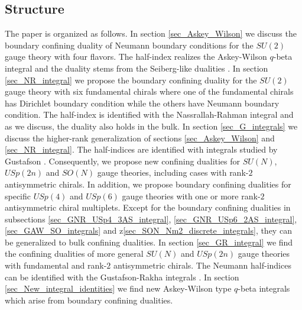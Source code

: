 \documentclass[12pt]{article}
\numberwithin{equation}{section}
\begin{document}
\subsection{Structure}
\label{sec_structure}
The paper is organized as follows. 
In section \ref{sec_Askey_Wilson} 
we discuss the boundary confining duality of Neumann boundary conditions for the $SU(2)$ gauge theory with four flavors. 
The half-index realizes the Askey-Wilson $q$-beta integral \cite{MR783216} and the duality stems from the Seiberg-like dualities \cite{Aharony:2013dha,Park:2013wta}. In section \ref{sec_NR_integral} we propose the boundary confining duality for the $SU(2)$ gauge theory with six fundamental chirals where one of the fundamental chirals has Dirichlet boundary condition while the others have Neumann boundary condition. The half-index is identified with the Nassrallah-Rahman integral \cite{MR772878,MR845667} and as we discuss, the duality also holds in the bulk. In section \ref{sec_G_integrals} we discuss the higher-rank generalization of sections \ref{sec_Askey_Wilson} and \ref{sec_NR_integral}. The half-indices are identified with integrals studied by Gustafson \cite{MR1139492}. Consequently, we propose new confining dualities for $SU(N)$, $USp(2n)$ and $SO(N)$ gauge theories, including cases with rank-$2$ antisymmetric chirals. 
In addition, we propose boundary confining dualities for specific $USp(4)$ and $USp(6)$ gauge theories with one or more rank-$2$ antisymmetric chiral multiplets. Except for the boundary confining dualities in subsections \ref{sec_GNR_USp4_3AS_integral}, \ref{sec_GNR_USp6_2AS_integral}, \ref{sec_GAW_SO_integrals} and z\ref{sec_SON_Nm2_discrete_integrals}, they can be generalized to bulk confining dualities. In section \ref{sec_GR_integral} we find the confining dualities of more general $SU(N)$ and $USp(2n)$ gauge theories with fundamental and rank-$2$ antisymmetric chirals. The Neumann half-indices can be identified with the Gustafson-Rakha integrals \cite{MR1266569}. In section \ref{sec_New_integral_identities} we find new Askey-Wilson type $q$-beta integrals which arise from boundary confining dualities. 

\end{document}
